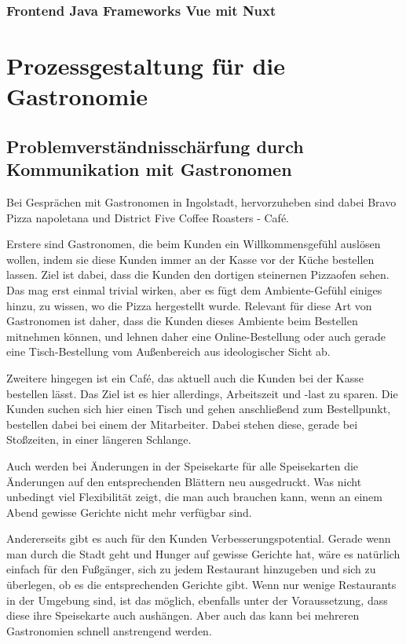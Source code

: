 \subsubsection{Frontend Java Frameworks Vue mit Nuxt}

\section{Prozessgestaltung für die Gastronomie}
\subsection{Problemverständnisschärfung durch Kommunikation mit Gastronomen}
\label{sec:problemverstaendnis_gastronomie}
Bei Gesprächen mit Gastronomen in Ingolstadt, hervorzuheben sind dabei Bravo Pizza napoletana und District Five Coffee Roasters - Café.

Erstere sind Gastronomen, die beim Kunden ein Willkommensgefühl auslösen wollen, indem sie diese Kunden immer an der Kasse vor der Küche bestellen lassen. Ziel ist dabei, dass die Kunden den dortigen steinernen Pizzaofen sehen. Das mag erst einmal trivial wirken, aber es fügt dem Ambiente-Gefühl einiges hinzu, zu wissen, wo die Pizza hergestellt wurde.
Relevant für diese Art von Gastronomen ist daher, dass die Kunden dieses Ambiente beim Bestellen mitnehmen können, und lehnen daher eine Online-Bestellung oder auch gerade eine Tisch-Bestellung vom Außenbereich aus ideologischer Sicht ab.

Zweitere hingegen ist ein Café, das aktuell auch die Kunden bei der Kasse bestellen lässt. Das Ziel ist es hier allerdings, Arbeitszeit und -last zu sparen. Die Kunden suchen sich hier einen Tisch und gehen anschließend zum Bestellpunkt, bestellen dabei bei einem der Mitarbeiter. Dabei stehen diese, gerade bei Stoßzeiten, in einer längeren Schlange.

Auch werden bei Änderungen in der Speisekarte für alle Speisekarten die Änderungen auf den entsprechenden Blättern neu ausgedruckt. Was nicht unbedingt viel Flexibilität zeigt, die man auch brauchen kann, wenn an einem Abend gewisse Gerichte nicht mehr verfügbar sind.

Andererseits gibt es auch für den Kunden Verbesserungspotential. Gerade wenn man durch die Stadt geht und Hunger auf gewisse Gerichte hat, wäre es natürlich einfach für den Fußgänger, sich zu jedem Restaurant hinzugeben und sich zu überlegen, ob es die entsprechenden Gerichte gibt. Wenn nur wenige Restaurants in der Umgebung sind, ist das möglich, ebenfalls unter der Voraussetzung, dass diese ihre Speisekarte auch aushängen. Aber auch das kann bei mehreren Gastronomien schnell anstrengend werden.


